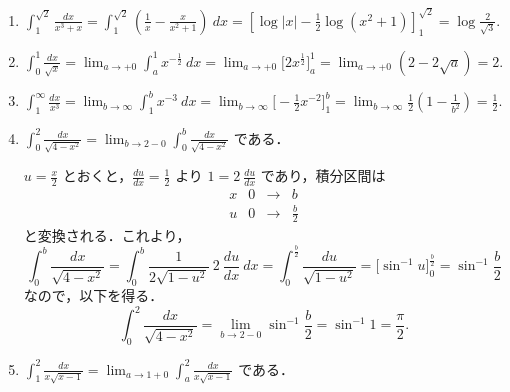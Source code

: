 \documentclass[11pt, uplatex, dvipdfmx]{jsarticle}
\newcommand{\ds}{\displaystyle}
\begin{document}
\begin{enumerate}[(1)]
   \item $\ds \int_{1}^{\sqrt{2}} \frac{dx}{x^3+x} = \int_{1}^{\sqrt{2}} \left( \frac{1}{x} - \frac{x}{x^2+1}\right) \ dx
     = \left[ \log |x| - \frac{1}{2} \log \left(x^2+1 \right)
     \right]_{1}^{\sqrt{2}} = \log \frac{2}{\sqrt{3}}. $
     
   \item $\ds \int_{0}^{1} \frac{dx}{\sqrt{x}} = \lim_{a \to +0} \int_{a}^{1}x^{-\frac{1}{2}} \ dx
     = \lim_{a \to +0} \Big[ 2x^{\frac{1}{2}} \Big]_{a}^{1} = \lim_{a \to +0}\left(2-2\sqrt{a}\right)=2.$

   \item $\ds \int_{1}^{\infty}\frac{dx}{x^3} = \lim_{b \to \infty} \int_{1}^{b} x^{-3} \ dx
     = \lim_{b \to \infty} \Big[ -\frac{1}{2}x^{-2}\Big]_{1}^{b} 
     = \lim_{b \to \infty} \frac{1}{2}\left( 1- \frac{1}{b^2}\right) = \frac{1}{2}.$

   \item $\ds \int_{0}^{2} \frac{dx}{\sqrt{4-x^2}} = \lim_{b \to 2-0} \int_{0}^{b} \frac{dx}{\sqrt{4-x^2}}$ である．

     \vspace{1zh}
     
     $u=\frac{x}{2}$ とおくと，$\frac{du}{dx}=\frac{1}{2}$ より $1=2\ \frac{du}{dx}$ であり，積分区間は
     \[
       \begin{array}{c|ccc}
         x & 0 & \to & b\\ \hline
         u & 0 & \to & \frac{b}{2}
       \end{array}
     \]
     と変換される．これより，
     \[
       \int_{0}^{b} \frac{dx}{\sqrt{4-x^2}} = \int_{0}^{b} \frac{1}{2\sqrt{1-u^2}}\  2\ \frac{du}{dx} \ dx
       = \int_{0}^{\frac{b}{2}} \frac{du}{\sqrt{1-u^2}}
       =\Big[ \sin^{-1} u \Big]_{0}^{\frac{b}{2}} = \sin^{-1} \frac{b}{2}
     \]
     なので，以下を得る．
     \[
       \int_{0}^{2} \frac{dx}{\sqrt{4-x^2}} = \lim_{b \to 2-0} \sin^{-1} \frac{b}{2} = \sin^{-1} 1 = \frac{\pi}{2}.
     \]

   \item $\ds \int_{1}^{2} \frac{dx}{x\sqrt{x-1}} = \lim_{a \to 1+0} \int_{a}^{2} \frac{dx}{x\sqrt{x-1}}$ である．

     \vspace{1zh}
     

\end{enumerate}
\end{document}
